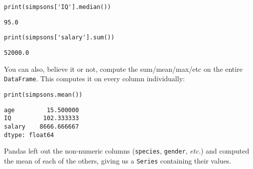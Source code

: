 
\begin{samepage}
\begin{Verbatim}[fontsize=\small,samepage=true,frame=single,framesep=3mm]
print(simpsons['IQ'].median())
\end{Verbatim}
\vspace{-.2in}

\begin{Verbatim}[fontsize=\small,samepage=true,frame=leftline,framesep=5mm,framerule=1mm]
95.0
\end{Verbatim}
\end{samepage}

\begin{samepage}
\begin{Verbatim}[fontsize=\small,samepage=true,frame=single,framesep=3mm]
print(simpsons['salary'].sum())
\end{Verbatim}
\vspace{-.2in}

\begin{Verbatim}[fontsize=\small,samepage=true,frame=leftline,framesep=5mm,framerule=1mm]
52000.0
\end{Verbatim}
\end{samepage}

You can also, believe it or not, compute the sum/mean/max/etc on the entire
\texttt{DataFrame}. This computes it on every column individually:

\begin{samepage}
\begin{Verbatim}[fontsize=\small,samepage=true,frame=single,framesep=3mm]
print(simpsons.mean())
\end{Verbatim}
\vspace{-.2in}

\begin{Verbatim}[fontsize=\small,samepage=true,frame=leftline,framesep=5mm,framerule=1mm]
age         15.500000
IQ         102.333333
salary    8666.666667
dtype: float64
\end{Verbatim}
\end{samepage}


Pandas left out the non-numeric columns (\texttt{species}, \texttt{gender},
\textit{etc.}) and computed the mean of each of the others, giving us a
\texttt{Series} containing their values.


